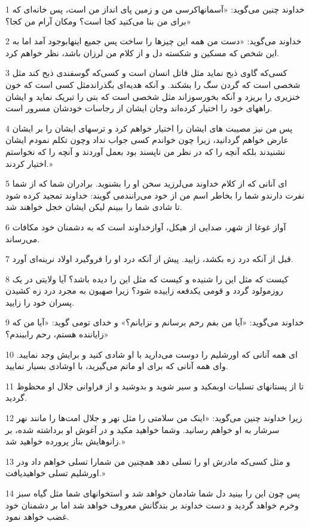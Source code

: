 \par 1 خداوند چنین می‌گوید: «آسمانهاکرسی من و زمین پای انداز من است، پس خانه‌ای که برای من بنا می‌کنید کجا است؟ ومکان آرام من کجا؟»
\par 2 خداوند می‌گوید: «دست من همه این چیزها را ساخت پس جمیع اینهابوجود آمد اما به این شخص که مسکین و شکسته دل و از کلام من لرزان باشد، نظر خواهم کرد.
\par 3 کسی‌که گاوی ذبح نماید مثل قاتل انسان است و کسی‌که گوسفندی ذبح کند مثل شخصی است که گردن سگ را بشکند. و آنکه هدیه‌ای بگذراندمثل کسی است که خون خنزیری را بریزد و آنکه بخور‌سوزاند مثل شخصی است که بتی را تبریک نماید و ایشان راههای خود را اختیار کرده‌اند وجان ایشان از رجاسات خودشان مسرور است.
\par 4 پس من نیز مصیبت های ایشان را اختیار خواهم کرد و ترسهای ایشان را بر ایشان عارض خواهم گردانید، زیرا چون خواندم کسی جواب نداد وچون تکلم نمودم ایشان نشنیدند بلکه آنچه را که در نظر من ناپسند بود بعمل آوردند و آنچه را که نخواستم اختیار کردند.» 
\par 5 ‌ای آنانی که از کلام خداوند می‌لرزید سخن او را بشنوید. برادران شما که از شما نفرت دارندو شما را بخاطر اسم من از خود می‌رانندمی گویند: خداوند تمجید کرده شود تا شادی شما را ببینم لیکن ایشان خجل خواهند شد.
\par 6 آواز غوغا از شهر، صدایی از هیکل، آوازخداوند است که به دشمنان خود مکافات می‌رساند.
\par 7 قبل از آنکه درد زه بکشد، زایید. پیش از آنکه درد او را فرو‌گیرد اولاد نرینه‌ای آورد.
\par 8 کیست که مثل این را شنیده و کیست که مثل این را دیده باشد؟ آیا ولایتی در یک روزمولود گردد و قومی یکدفعه زاییده شود؟ زیرا صهیون به مجرد درد زه کشیدن پسران خود را زایید.
\par 9 خداوند می‌گوید: «آیا من بفم رحم برسانم و نزایانم؟» و خدای تومی گوید: «آیا من که زایاننده هستم، رحم راببندم؟»
\par 10 ‌ای همه آنانی که اورشلیم را دوست می‌دارید با او شادی کنید و برایش وجد نمایید. وای همه آنانی که برای او ماتم می‌گیرید، با اوشادی بسیار نمایید.
\par 11 تا از پستانهای تسلیات اوبمکید و سیر شوید و بدوشید و از فراوانی جلال او محظوظ گردید.
\par 12 زیرا خداوند چنین می‌گوید: «اینک من سلامتی را مثل نهر و جلال امت‌ها را مانند نهر سرشار به او خواهم رسانید. وشما خواهید مکید و در آغوش او برداشته شده، بر زانوهایش بناز پرورده خواهید شد.»
\par 13 و مثل کسی‌که مادرش او را تسلی دهد همچنین من شمارا تسلی خواهم داد ودر اورشلیم تسلی خواهیدیافت.»
\par 14 پس چون این را بینید دل شما شادمان خواهد شد و استخوانهای شما مثل گیاه سبز وخرم خواهد گردید و دست خداوند بر بندگانش معروف خواهد شد اما بر دشمنان خود غضب خواهد نمود.
